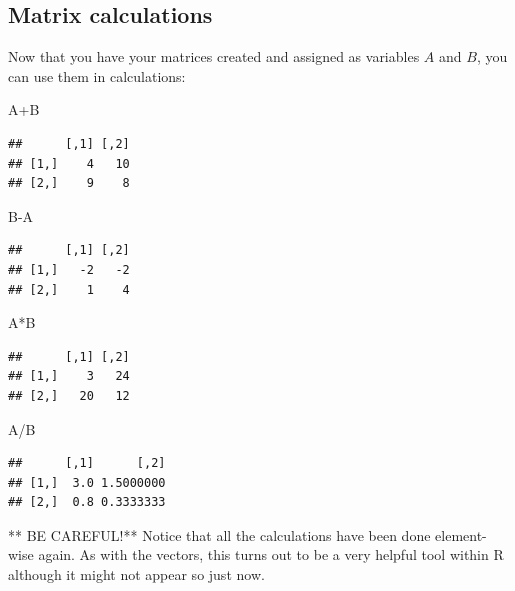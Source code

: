 \documentclass[
]{book}
\newenvironment{Shaded}{\begin{snugshade}}{\end{snugshade}}
\newcommand{\NormalTok}[1]{#1}
\newcommand{\SpecialCharTok}[1]{\textcolor[rgb]{0.00,0.00,0.00}{#1}}
\theoremstyle{definition}
\theoremstyle{definition}
\theoremstyle{definition}
\theoremstyle{definition}
\theoremstyle{remark}
\begin{document}
\hypertarget{matrix-calculations}{%
\subsection{Matrix calculations}\label{matrix-calculations}}

Now that you have your matrices created and assigned as variables \(A\) and \(B\), you can use them in calculations:

\begin{Shaded}
\begin{Highlighting}[]
\NormalTok{A}\SpecialCharTok{+}\NormalTok{B}
\end{Highlighting}
\end{Shaded}

\begin{verbatim}
##      [,1] [,2]
## [1,]    4   10
## [2,]    9    8
\end{verbatim}

\begin{Shaded}
\begin{Highlighting}[]
\NormalTok{B}\SpecialCharTok{{-}}\NormalTok{A}
\end{Highlighting}
\end{Shaded}

\begin{verbatim}
##      [,1] [,2]
## [1,]   -2   -2
## [2,]    1    4
\end{verbatim}

\begin{Shaded}
\begin{Highlighting}[]
\NormalTok{A}\SpecialCharTok{*}\NormalTok{B}
\end{Highlighting}
\end{Shaded}

\begin{verbatim}
##      [,1] [,2]
## [1,]    3   24
## [2,]   20   12
\end{verbatim}

\begin{Shaded}
\begin{Highlighting}[]
\NormalTok{A}\SpecialCharTok{/}\NormalTok{B}
\end{Highlighting}
\end{Shaded}

\begin{verbatim}
##      [,1]      [,2]
## [1,]  3.0 1.5000000
## [2,]  0.8 0.3333333
\end{verbatim}

** BE CAREFUL!** Notice that all the calculations have been done element-wise again. As with the vectors, this turns out to be a very helpful tool within R although it might not appear so just now.
\end{document}
